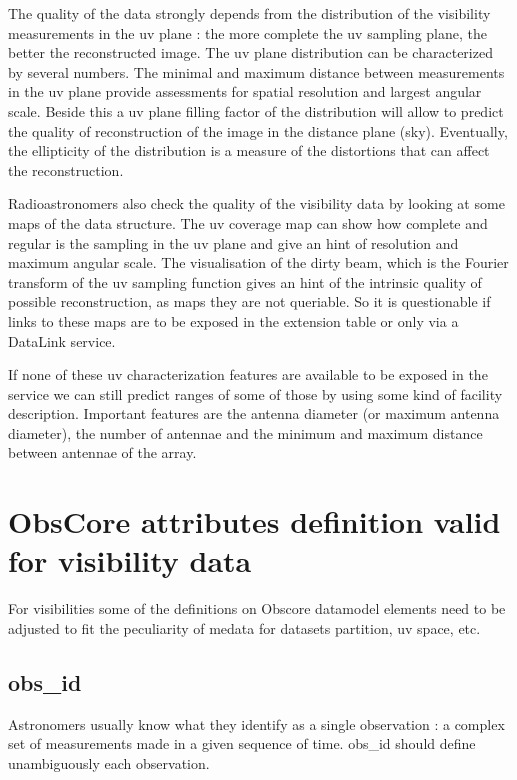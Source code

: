 \documentclass[11pt,a4paper]{ivoa}
\begin{document}
     The quality of the data strongly depends from the distribution of the visibility measurements in the uv plane : the more complete the uv sampling plane, the better the reconstructed image. The uv plane distribution can be characterized by several numbers. 
The minimal and maximum distance between measurements in the uv plane provide assessments for spatial 
resolution and largest angular scale. 
Beside this a uv plane filling factor of the distribution will allow to predict the quality of reconstruction
of the image in the distance plane (sky).
Eventually, the ellipticity of the distribution is a measure of the distortions that can affect the reconstruction.
          
          Radioastronomers also check the quality of the visibility data by looking at some maps of the data structure. The uv coverage map can show how complete and regular is the sampling in the uv plane and give an hint of resolution and maximum angular scale. 
The visualisation of the dirty beam, which is the Fourier transform of the uv sampling function gives an hint of the intrinsic quality of possible reconstruction, as maps they are not queriable. So it is questionable if links to these maps are to be exposed in the extension table or only via a DataLink service. 
          
          If none of these uv characterization features are available to be exposed in the service we can still predict ranges of some of those by using some kind of facility description.  
          Important features are the antenna diameter (or maximum antenna diameter), the number of antennae and the minimum and maximum distance between antennae of the array.

\section{ObsCore attributes definition valid for visibility data}
\label{sec:ObsCoreVisDef}

For visibilities some of the definitions on Obscore datamodel elements need to be adjusted to fit
the peculiarity of medata for datasets partition, uv space, etc.

\subsection{obs\_id}

Astronomers usually know what they identify as a single observation : a complex set of measurements made in a given sequence of time. obs\_id should define unambiguously each observation.
\end{document}
